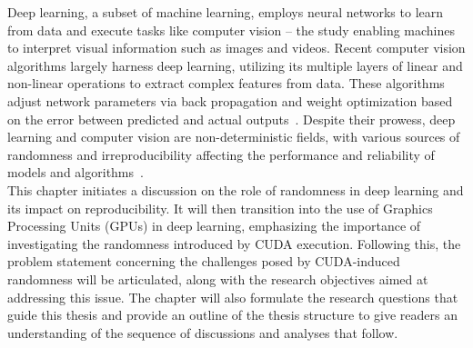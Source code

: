 







Deep learning, a subset of machine learning, employs neural networks to learn from data and execute tasks like computer vision -- the study enabling machines to interpret visual information such as images and videos. Recent computer vision algorithms largely harness deep learning, utilizing its multiple layers of linear and non-linear operations to extract complex features from data. These algorithms adjust network parameters via back propagation and weight optimization based on the error between predicted and actual outputs~\cite{testwebsite}. Despite their prowess, deep learning and computer vision are non-deterministic fields, with various sources of randomness and irreproducibility affecting the performance and reliability of models and algorithms~\cite{zhuang2022randomness}.\\

This chapter initiates a discussion on the role of randomness in deep learning and its impact on reproducibility. It will then transition into the use of Graphics Processing Units (GPUs) in deep learning, emphasizing the importance of investigating the randomness introduced by CUDA execution. Following this, the problem statement concerning the challenges posed by CUDA-induced randomness will be articulated, along with the research objectives aimed at addressing this issue. The chapter will also formulate the research questions that guide this thesis and provide an outline of the thesis structure to give readers an understanding of the sequence of discussions and analyses that follow.\\

